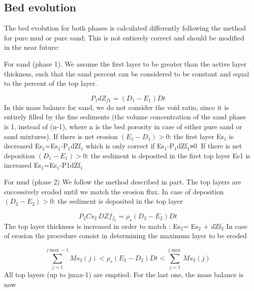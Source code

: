\subsection{Bed evolution}

The bed evolution for both phases is calculated differently following the
method for pure mud or pure sand; This is not entierely correct and should
be modified in the near future:

For sand (phase 1).\newline
We assume the first layer to be greater than the active layer thickness,
such that the sand percent can be considered to be constant and equal to the
percent of the top layer.

\begin{equation*}
P_{1} dZ_{f1} =(D_{1} -E_{1} )Dt 
\end{equation*}
In this mass balance for sand, we do not consider the void ratio, since it
is entirely filled by the fine sediments (the volume concentration of the
sand phase is 1, instead of (n-1), where n is the bed porosity in case of
either pure sand or sand mixtures).\newline
If there is net erosion $(E_{1} -D_{1} )>0$: the first layer Es$_{1}$ is
decreased Es$_{1}$=Es$_{1}$-P$_{1}$dZf$_{1}$\newline
which is only correct if Es$_{1}$-P$_{1}$dZf$_{1}$\texttt{>}0$_{.}$\newline
If there is net deposition $(D_{1} -E_{1} )>0$: the sediment is deposited in
the first top layer Es1 is increased Es$_{1}$=Es$_{1}$-P1dZf$_{1}$

For mud (phase 2)\newline
We follow the method described in part. The top layers are successively
eroded until we match the erosion flux.\newline
In case of deposition $(D_{2} -E_{2} )>0$: the sediment is deposited in the
top layer

\begin{equation*}
P_2 C s_2 \,DZf_{f_2} =\rho_s (D_2 - E_2) Dt 
\end{equation*}
The top layer thickness is increased in order to match : Es$_{2}$= Es$_{2}$
+ dZf$_{2}$\newline
In case of erosion the procedure consist in determining the maximum layer to
be eroded

\begin{equation*}
\sum\limits_{j=1}^{j\max -1}Ms_{2} (j) <\rho _{s} (E_{2} -D_{2}
)Dt<\sum\limits_{j=1}^{j\max }Ms_{2} (j) 
\end{equation*}
All top layers (up to jmax-1) are emptied{\nobreakspace}: \newline
For the last one, the mass balance is now

